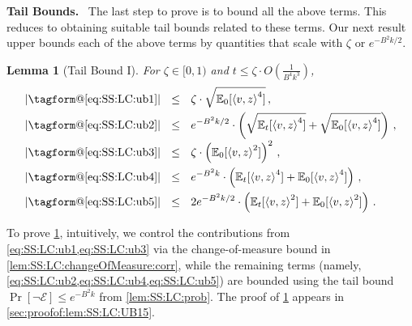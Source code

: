 \documentclass[11pt,letterpaper]{article}
\makeatletter
\theoremstyle{plain}
\newtheorem{lemma}[theorem]{Lemma}
\theoremstyle{definition}
\theoremstyle{remark}
\renewcommand{\eqref}[1]{\textup{\eqrefform@{\ref{#1}}}}
\let\eqrefform@\tagform@
\def\abs#1{\left| #1 \right|}
\newcommand{\sinsquare}[1]{\ensuremath{[#1]}}
\newcommand{\inparen}[1]{\ensuremath{\left(#1\right)}}
\newcommand{\inangle}[1]{\left\langle#1\right\rangle}
\newcommand{\evE}{\ensuremath{\mathscr{E}}}
\newcommand{\E}{\operatornamewithlimits{\mathbb{E}}}
\newcommand{\Ex}{\E}
\renewcommand{\paragraph}[1]{\medskip \noindent\textbf{#1}~}
\makeatother
\begin{document}
{{        \paragraph{Tail Bounds.} 
        {The last step to prove  is to bound all the above terms. This reduces to obtaining {suitable} tail bounds {related to} these terms.}
        Our next result upper bounds each of the above terms by quantities that scale with $\zeta$ or $e^{-B^2k/2}$.
        \begin{lemma}[Tail Bound I]
            \label{lem:SS:LC:UB15}
            \label{lem:SS:LC:tailBoundI}
            For $\zeta\in [0,1)$ and $t\leq \zeta \cdot O\inparen{\frac{1}{B^4k^3}}$,
           \begin{align*}
               \abs{\eqref{eq:SS:LC:ub1}}
                    &~~\leq~~ \zeta
                    \cdot \sqrt{\Ex\nolimits_{0}\sinsquare{\inangle{v, z}^4}}\,,\\
                \abs{\eqref{eq:SS:LC:ub2}}
                    &~~\leq~~ 
                    e^{-B^2 k/2}\cdot
                    \inparen{ 
                        \sqrt{\Ex\nolimits_{t}\sinsquare{\inangle{v, z}^4}}
                        +
                        \sqrt{\Ex\nolimits_{0}\sinsquare{\inangle{v, z}^4}}
                    }\,,\\[-1mm]
                \abs{\eqref{eq:SS:LC:ub3}}
                    &~~\leq~~ \zeta
                    \cdot \inparen{\Ex\nolimits_{0}\sinsquare{{\inangle{v, z}}^2}}^2\,,\\
                \abs{\eqref{eq:SS:LC:ub4}}
                    &~~\leq ~~
                    e^{-B^2 k}\cdot
                    \inparen{
                        {\Ex\nolimits_{t}\sinsquare{{\inangle{v, z}}^4}}
                        +
                        {\Ex\nolimits_{0}\sinsquare{{\inangle{v, z}}^4}}
                    }\,,\\
                \abs{\eqref{eq:SS:LC:ub5}}
                    &~~\leq~~ 2e^{-B^2 k/2}\cdot
                    \inparen{
                        {\Ex\nolimits_{t}\sinsquare{\inangle{v, z}^2}}
                        +
                        {\Ex\nolimits_{0}\sinsquare{\inangle{v, z}^2}}
                    }\,.
           \end{align*} 
        \end{lemma}
        To prove \cref{lem:SS:LC:UB15}, intuitively, we control the contributions from \cref{eq:SS:LC:ub1,eq:SS:LC:ub3} via the change-of-measure bound in \cref{lem:SS:LC:changeOfMeasure:corr}, while the remaining terms (namely, \cref{eq:SS:LC:ub2,eq:SS:LC:ub4,eq:SS:LC:ub5}) are bounded using the tail bound $\Pr[\lnot\evE]\le e^{-B^2 k}$ from \cref{lem:SS:LC:prob}.
        The proof of \cref{lem:SS:LC:UB15} appears in \cref{sec:proofof:lem:SS:LC:UB15}.
        
}}
\end{document}
